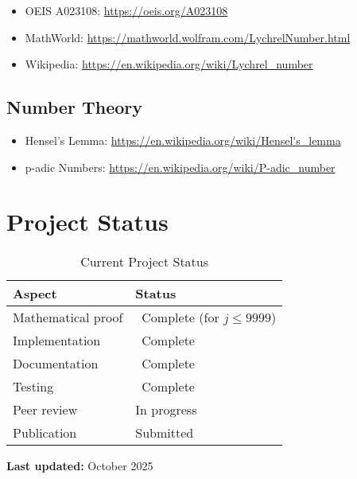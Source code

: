 \documentclass[11pt,a4paper]{article}
\newcommand{\cmark}{\ding{51}}
\begin{document}
\begin{itemize}[leftmargin=*,noitemsep]
\item OEIS A023108: \url{https://oeis.org/A023108}
\item MathWorld: \url{https://mathworld.wolfram.com/LychrelNumber.html}
\item Wikipedia: \url{https://en.wikipedia.org/wiki/Lychrel_number}
\end{itemize}

\subsection{Number Theory}

\begin{itemize}[leftmargin=*,noitemsep]
\item Hensel's Lemma: \url{https://en.wikipedia.org/wiki/Hensel's_lemma}
\item p-adic Numbers: \url{https://en.wikipedia.org/wiki/P-adic_number}
\end{itemize}

\section{Project Status}

\begin{table}[H]
\centering
\caption{Current Project Status}
\begin{tabular}{@{}ll@{}}
\toprule
\textbf{Aspect} & \textbf{Status} \\
\midrule
Mathematical proof & \cmark\ Complete (for $j \leq 9999$) \\
Implementation & \cmark\ Complete \\
Documentation & \cmark\ Complete \\
Testing & \cmark\ Complete \\
Peer review & In progress \\
Publication & Submitted \\
\bottomrule
\end{tabular}
\end{table}

\textbf{Last updated:} October 2025

\appendix
\end{document}
